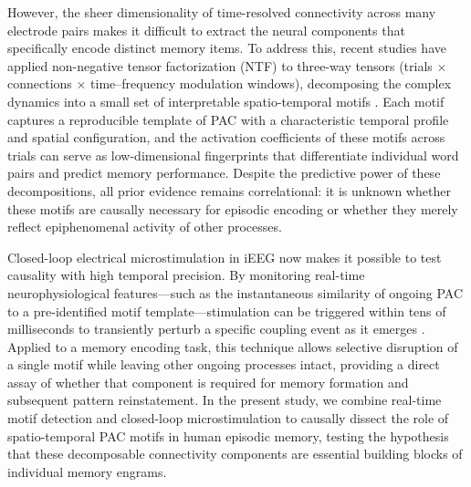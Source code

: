 \documentclass{article}
\begin{document}
However, the sheer dimensionality of time-resolved connectivity across many electrode pairs makes it difficult to extract the neural components that specifically encode distinct memory items.  To address this, recent studies have applied non-negative tensor factorization (NTF) to three-way tensors (trials $\times$ connections $\times$ time–frequency modulation windows), decomposing the complex dynamics into a small set of interpretable spatio-temporal motifs \cite{Vidaurre2019}.  Each motif captures a reproducible template of PAC with a characteristic temporal profile and spatial configuration, and the activation coefficients of these motifs across trials can serve as low-dimensional fingerprints that differentiate individual word pairs and predict memory performance.  Despite the predictive power of these decompositions, all prior evidence remains correlational: it is unknown whether these motifs are causally necessary for episodic encoding or whether they merely reflect epiphenomenal activity of other processes.

Closed-loop electrical microstimulation in iEEG now makes it possible to test causality with high temporal precision.  By monitoring real-time neurophysiological features—such as the instantaneous similarity of ongoing PAC to a pre-identified motif template—stimulation can be triggered within tens of milliseconds to transiently perturb a specific coupling event as it emerges \cite{Ezzyat2017, Rao2021}.  Applied to a memory encoding task, this technique allows selective disruption of a single motif while leaving other ongoing processes intact, providing a direct assay of whether that component is required for memory formation and subsequent pattern reinstatement.  In the present study, we combine real-time motif detection and closed-loop microstimulation to causally dissect the role of spatio-temporal PAC motifs in human episodic memory, testing the hypothesis that these decomposable connectivity components are essential building blocks of individual memory engrams.
\end{document}
